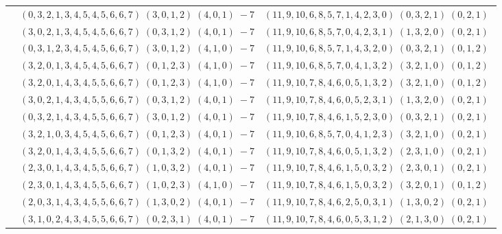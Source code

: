 \documentclass[11pt]{article}
\begin{document}
\begin{longtable}[l]{|c|c|c|}
 \cline{2-3} 
 & $(0 ,3 ,2 ,1 ,3 ,4 ,5 ,4 ,5 ,6 ,6 ,7) \;(3 ,0 ,1 ,2) \;(4 ,0 ,1) \;-7$ & $(11 ,9 ,10 ,6 ,8 ,5 ,7 ,1 ,4 ,2 ,3 ,0) \;(0 ,3 ,2 ,1) \;(0 ,2 ,1) \;$\\ 
 \cline{2-3} 
 & $(3 ,0 ,2 ,1 ,3 ,4 ,5 ,4 ,5 ,6 ,6 ,7) \;(0 ,3 ,1 ,2) \;(4 ,0 ,1) \;-7$ & $(11 ,9 ,10 ,6 ,8 ,5 ,7 ,0 ,4 ,2 ,3 ,1) \;(1 ,3 ,2 ,0) \;(0 ,2 ,1) \;$\\ 
 \cline{2-3} 
 & $(0 ,3 ,1 ,2 ,3 ,4 ,5 ,4 ,5 ,6 ,6 ,7) \;(3 ,0 ,1 ,2) \;(4 ,1 ,0) \;-7$ & $(11 ,9 ,10 ,6 ,8 ,5 ,7 ,1 ,4 ,3 ,2 ,0) \;(0 ,3 ,2 ,1) \;(0 ,1 ,2) \;$\\ 
 \cline{2-3} 
 & $(3 ,2 ,0 ,1 ,3 ,4 ,5 ,4 ,5 ,6 ,6 ,7) \;(0 ,1 ,2 ,3) \;(4 ,1 ,0) \;-7$ & $(11 ,9 ,10 ,6 ,8 ,5 ,7 ,0 ,4 ,1 ,3 ,2) \;(3 ,2 ,1 ,0) \;(0 ,1 ,2) \;$\\ 
 \cline{2-3} 
 & $(3 ,2 ,0 ,1 ,4 ,3 ,4 ,5 ,5 ,6 ,6 ,7) \;(0 ,1 ,2 ,3) \;(4 ,1 ,0) \;-7$ & $(11 ,9 ,10 ,7 ,8 ,4 ,6 ,0 ,5 ,1 ,3 ,2) \;(3 ,2 ,1 ,0) \;(0 ,1 ,2) \;$\\ 
 \cline{2-3} 
 & $(3 ,0 ,2 ,1 ,4 ,3 ,4 ,5 ,5 ,6 ,6 ,7) \;(0 ,3 ,1 ,2) \;(4 ,0 ,1) \;-7$ & $(11 ,9 ,10 ,7 ,8 ,4 ,6 ,0 ,5 ,2 ,3 ,1) \;(1 ,3 ,2 ,0) \;(0 ,2 ,1) \;$\\ 
 \cline{2-3} 
 & $(0 ,3 ,2 ,1 ,4 ,3 ,4 ,5 ,5 ,6 ,6 ,7) \;(3 ,0 ,1 ,2) \;(4 ,0 ,1) \;-7$ & $(11 ,9 ,10 ,7 ,8 ,4 ,6 ,1 ,5 ,2 ,3 ,0) \;(0 ,3 ,2 ,1) \;(0 ,2 ,1) \;$\\ 
 \cline{2-3} 
 & $(3 ,2 ,1 ,0 ,3 ,4 ,5 ,4 ,5 ,6 ,6 ,7) \;(0 ,1 ,2 ,3) \;(4 ,0 ,1) \;-7$ & $(11 ,9 ,10 ,6 ,8 ,5 ,7 ,0 ,4 ,1 ,2 ,3) \;(3 ,2 ,1 ,0) \;(0 ,2 ,1) \;$\\ 
 \cline{2-3} 
 & $(3 ,2 ,0 ,1 ,4 ,3 ,4 ,5 ,5 ,6 ,6 ,7) \;(0 ,1 ,3 ,2) \;(4 ,0 ,1) \;-7$ & $(11 ,9 ,10 ,7 ,8 ,4 ,6 ,0 ,5 ,1 ,3 ,2) \;(2 ,3 ,1 ,0) \;(0 ,2 ,1) \;$\\ 
 \cline{2-3} 
 & $(2 ,3 ,0 ,1 ,4 ,3 ,4 ,5 ,5 ,6 ,6 ,7) \;(1 ,0 ,3 ,2) \;(4 ,0 ,1) \;-7$ & $(11 ,9 ,10 ,7 ,8 ,4 ,6 ,1 ,5 ,0 ,3 ,2) \;(2 ,3 ,0 ,1) \;(0 ,2 ,1) \;$\\ 
 \cline{2-3} 
 & $(2 ,3 ,0 ,1 ,4 ,3 ,4 ,5 ,5 ,6 ,6 ,7) \;(1 ,0 ,2 ,3) \;(4 ,1 ,0) \;-7$ & $(11 ,9 ,10 ,7 ,8 ,4 ,6 ,1 ,5 ,0 ,3 ,2) \;(3 ,2 ,0 ,1) \;(0 ,1 ,2) \;$\\ 
 \cline{2-3} 
 & $(2 ,0 ,3 ,1 ,4 ,3 ,4 ,5 ,5 ,6 ,6 ,7) \;(1 ,3 ,0 ,2) \;(4 ,0 ,1) \;-7$ & $(11 ,9 ,10 ,7 ,8 ,4 ,6 ,2 ,5 ,0 ,3 ,1) \;(1 ,3 ,0 ,2) \;(0 ,2 ,1) \;$\\ 
 \cline{2-3} 
 & $(3 ,1 ,0 ,2 ,4 ,3 ,4 ,5 ,5 ,6 ,6 ,7) \;(0 ,2 ,3 ,1) \;(4 ,0 ,1) \;-7$ & $(11 ,9 ,10 ,7 ,8 ,4 ,6 ,0 ,5 ,3 ,1 ,2) \;(2 ,1 ,3 ,0) \;(0 ,2 ,1) \;$\\ 

\end{longtable}
\end{document}
